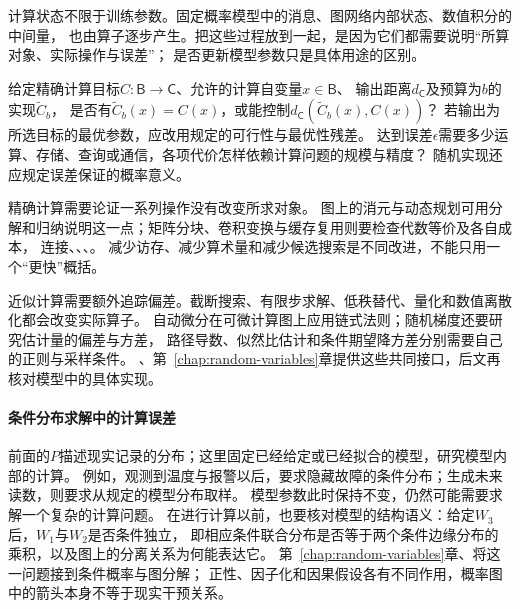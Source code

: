 计算状态不限于训练参数。固定概率模型中的消息、图网络内部状态、数值积分的中间量，
也由算子逐步产生。把这些过程放到一起，是因为它们都需要说明“所算对象、实际操作与误差”；
是否更新模型参数只是具体用途的区别。

\begin{mathproblem}
  \label{question:future-computation}
  给定精确计算目标$C:\mathsf B\to\mathsf C$、允许的计算自变量$x\in\mathsf B$、
  输出距离$d_{\mathsf C}$及预算为$b$的实现$\widetilde C_b$，
  是否有$\widetilde C_b(x)=C(x)$，或能控制$d_{\mathsf C}(\widetilde C_b(x),C(x))$？
  若输出为所选目标的最优参数，应改用规定的可行性与最优性残差。
  达到误差$\epsilon$需要多少运算、存储、查询或通信，各项代价怎样依赖计算问题的规模与精度？
  随机实现还应规定误差保证的概率意义。
\end{mathproblem}

精确计算需要论证一系列操作没有改变所求对象。
图上的消元与动态规划可用分解和归纳说明这一点；矩阵分块、卷积变换与缓存复用则要检查代数等价及各自成本，
连接、、、。
减少访存、减少算术量和减少候选搜索是不同改进，不能只用一个“更快”概括。

近似计算需要额外追踪偏差。截断搜索、有限步求解、低秩替代、量化和数值离散化都会改变实际算子。
自动微分在可微计算图上应用链式法则；随机梯度还要研究估计量的偏差与方差，
路径导数、似然比估计和条件期望降方差分别需要自己的正则与采样条件。
、第~\ref{chap:random-variables}章提供这些共同接口，后文再核对模型中的具体实现。

\paragraph{条件分布求解中的计算误差}
\label{sec:future-analysis-probabilistic-query}

前面的$P$描述现实记录的分布；这里固定已经给定或已经拟合的模型，研究模型内部的计算。
例如，观测到温度与报警以后，要求隐藏故障的条件分布；生成未来读数，则要求从规定的模型分布取样。
模型参数此时保持不变，仍然可能需要求解一个复杂的计算问题。
在进行计算以前，也要核对模型的结构语义：给定$W_3$后，$W_1$与$W_2$是否条件独立，
即相应条件联合分布是否等于两个条件边缘分布的乘积，以及图上的分离关系为何能表达它。
第~\ref{chap:random-variables}章、将这一问题接到条件概率与图分解；
正性、因子化和因果假设各有不同作用，概率图中的箭头本身不等于现实干预关系。

